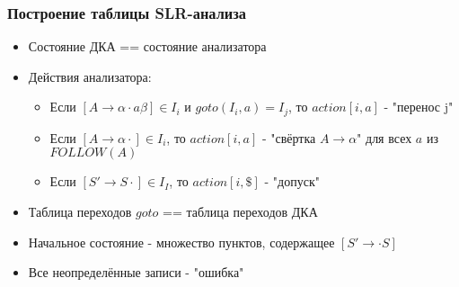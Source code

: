 \documentclass[16pt,pdf,unicode]{beamer}
\begin{document}
\begin{frame}
\frametitle{Построение таблицы SLR-анализа}
\begin{itemize}
  \item Состояние ДКА == состояние анализатора
  \item Действия анализатора:
    \begin{itemize}
      \item Если $[A \rightarrow \alpha \cdot a \beta]\in I_i$ и $goto(I_i,a)=I_j$, то $action[i,a]$ - "перенос j"
      \item Если $[A \rightarrow \alpha \cdot]\in I_i$, то $action[i,a]$ - "свёртка $A \rightarrow \alpha$" для всех $a$ из $FOLLOW(A)$
      \item Если $[S' \rightarrow S \cdot ] \in I_I$, то $action[i,\$]$ - "допуск"
    \end{itemize}
  \item Таблица переходов $goto$ == таблица переходов ДКА
  \item Начальное состояние - множество пунктов, содержащее $[S' \rightarrow \cdot S]$
  \item Все неопределённые записи - "ошибка"
\end{itemize}
\end{frame}
\end{document}
